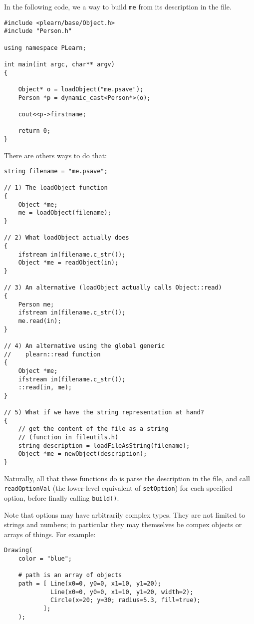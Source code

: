 \documentclass[11pt]{book}
\begin{document}
In the following code, we a way to build {\tt me} from its description
in the file.

\begin{verbatim}
#include <plearn/base/Object.h>
#include "Person.h"

using namespace PLearn;

int main(int argc, char** argv)
{

    Object* o = loadObject("me.psave"); 
    Person *p = dynamic_cast<Person*>(o);

    cout<<p->firstname;

    return 0;
}
\end{verbatim}


There are others ways to do that:

\begin{verbatim}
string filename = "me.psave";

// 1) The loadObject function
{
    Object *me;
    me = loadObject(filename);
}

// 2) What loadObject actually does
{
    ifstream in(filename.c_str());
    Object *me = readObject(in);
}

// 3) An alternative (loadObject actually calls Object::read)
{
    Person me; 
    ifstream in(filename.c_str());
    me.read(in);
}

// 4) An alternative using the global generic 
//    plearn::read function
{
    Object *me;
    ifstream in(filename.c_str());
    ::read(in, me);
}

// 5) What if we have the string representation at hand?
{
    // get the content of the file as a string
    // (function in fileutils.h)
    string description = loadFileAsString(filename);
    Object *me = newObject(description);
}
\end{verbatim}

Naturally, all that these functions do is parse the description in
the file, and call {\tt readOptionVal} (the lower-level equivalent
of {\tt setOption}) for each specified option, before finally calling
{\tt build()}.

Note that options may have arbitrarily complex types. They are not limited to strings and numbers; in particular they may
themselves be compex objects or arrays of things. For example:

\begin{verbatim}
Drawing(
    color = "blue";

    # path is an array of objects
    path = [ Line(x0=0, y0=0, x1=10, y1=20); 
             Line(x0=0, y0=0, x1=10, y1=20, width=2);
             Circle(x=20; y=30; radius=5.3, fill=true);
           ];
    );
\end{verbatim}
\end{document}
